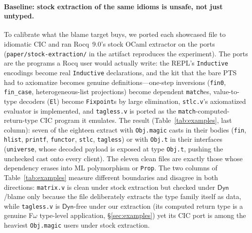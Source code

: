\documentclass[acmsmall,anonymous=false,nonacm]{acmart}
\newcommand{\dyn}{\ensuremath{\mathsf{Dyn}}}
\begin{document}
\paragraph{Baseline: stock extraction of the same idioms is unsafe, not just
untyped.}
To calibrate what the blame target buys, we ported each showcased file to
idiomatic CIC and ran Rocq~9.0's stock OCaml extractor on the ports
(\texttt{paper/stock-extraction/} in the artifact reproduces the experiment).
The ports are the programs a Rocq user would actually write: the REPL's
\texttt{Inductive} encodings become real \texttt{Inductive} declarations, and
the kit that the bare PTS had to axiomatize becomes genuine
definitions---one-step inversions (\texttt{fin0}, \texttt{fin\_case},
heterogeneous-list projections) become dependent \texttt{match}es, value-to-type
decoders (\texttt{El}) become \texttt{Fixpoint}s by large elimination,
\texttt{stlc.v}'s axiomatized evaluator is implemented, and \texttt{tagless.v}
is ported as the \texttt{match}-computed-return-type CIC program it emulates.
The result (Table~\ref{tab:examples}, last column): seven of the eighteen
extract with \texttt{Obj.magic} casts in their bodies (\texttt{fin},
\texttt{hlist}, \texttt{printf}, \texttt{functor}, \texttt{stlc},
\texttt{tagless}) or with \texttt{Obj.t} in their interfaces
(\texttt{universe}, whose decoded payload is exposed at type \texttt{Obj.t},
pushing the unchecked cast onto every client).  The eleven clean files are
exactly those whose dependency erases into ML polymorphism or \texttt{Prop}.
The two columns of Table~\ref{tab:examples} measure different boundaries and
disagree in both directions: \texttt{matrix.v} is clean under stock
extraction but checked under $\dyn$/blame only because the file deliberately
extracts the type family itself as data, while \texttt{tagless.v} is
$\dyn$-free under our extraction (its computed return type is a genuine
F$\omega$ type-level application, \S\ref{sec:examples}) yet its CIC port is
among the heaviest \texttt{Obj.magic} users under stock extraction.
\end{document}
